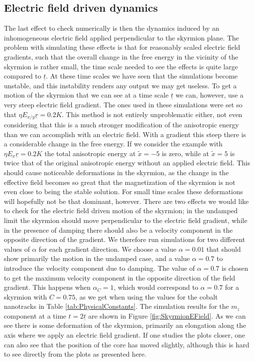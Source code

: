 \subsection{Electric field driven dynamics}
The last effect to check numerically is then the dynamics induced by an inhomogeneous electric field applied perpendicular to the skyrmion plane. The problem with simulating these effects is that for reasonably scaled electric field gradients, such that the overall change in the free energy in the vicinity of the skyrmion is rather small, the time scale needed to see the effects is quite large compared to $\underline{t}$. At these time scales we have seen that the simulations become unstable, and this instability renders any output we may get useless. To get a motion of the skyrmion that we can see at a time scale $\underline{t}$ we can, however, use a very steep electric field gradient. The ones used in these simulations were set so that $\eta E_{x/y}\underline{r} = 0.2 K$. This method is not entirely unproblematic either, not even considering that this is a much stronger modification of the anisotropic energy than we can accomplish with an electric field. With a gradient this steep there is a considerable change in the free energy. If we consider the example with $\eta E_{x}\underline{r} = 0.2 K$ the total anisotropic energy at $\tilde{x}=-5$ is zero, while at $\tilde{x}=5$ is twice that of the original anisotropic energy without an applied electric field. This should cause noticeable deformations in the skyrmion, as the change in the effective field becomes so great that the magnetization of the skyrmion is not even close to being the stable solution. For small time scales these deformations will hopefully not be that dominant, however. There are two effects we would like to check for the electric field driven motion of the skyrmion; in the undamped limit the skyrmion should move perpendicular to the electric field gradient, while in the presence of damping there should also be a velocity component in the opposite direction of the gradient. We therefore run simulations for two different values of $\alpha$ for each gradient direction. We choose a value $\alpha=0.01$ that should show primarily the motion in the undamped case, and a value $\alpha=0.7$ to introduce the velocity component due to damping. The value of $\alpha=0.7$ is chosen to get the maximum velocity component in the opposite direction of the field gradient. This happens when $\alpha_C=1$, which would correspond to $\alpha=0.7$ for a skyrmion with $C=0.75$, as we get when using the values for the cobalt nanotracks in Table \ref{tab:PhysicalConstants}. The simulation results for the $m_z$ component at a time $t=2\underline{t}$ are shown in Figure \ref{fig:SkyrmionEField}. As we can see there is some deformation of the skyrmion, primarily an elongation along the axis where we apply an electric field gradient. If one studies the plots closer, one can also see that the position of the core has moved slightly, although this is hard to see directly from the plots as presented here.

